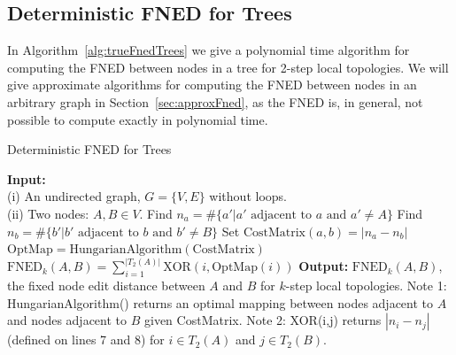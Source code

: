 \documentclass{article}
\begin{document}
\newpage
\subsection{Deterministic FNED for Trees}

In Algorithm~\ref{alg:trueFnedTrees} we give a polynomial time algorithm for computing the FNED between nodes in a tree for 2-step local topologies. We will give approximate algorithms for computing the FNED between nodes in an arbitrary graph in Section~\ref{sec:approxFned}, as the FNED is, in general, not possible to compute exactly in polynomial time.  %
\begin{algorithm}[h!tbp]
\caption{Deterministic FNED for Trees}
\label{alg:trueFnedTrees}
\begin{algorithmic}[1]
\STATE \textbf{Input:} \\(i) An undirected graph, $G = \{V,E\}$ without loops.\\(ii) Two nodes: $A, B \in V$.
\STATE Find $n_{a} = \# \{ a' | a' \text{ adjacent to } a \text{ and } a' \neq A \}$
\STATE Find $n_{b} = \# \{ b' | b' \text{ adjacent to } b \text{ and } b' \neq B \}$
\STATE Set $\text{CostMatrix}(a,b) = | n_{a} - n_{b} |$
\ENDFOR
\ENDFOR
\STATE $\text{OptMap}=\text{HungarianAlgorithm}(\text{CostMatrix})$
\STATE $\text{FNED}_{k}(A,B) = \sum_{i=1}^{|T_{2}(A)|} \text{XOR}(i,\text{OptMap}(i))$
\STATE \textbf{Output:} $\text{FNED}_{k}(A,B)$, the fixed node edit distance between $A$ and $B$ for $k$-step local topologies.
\STATE Note 1: HungarianAlgorithm() returns an optimal mapping between nodes adjacent to $A$ and nodes adjacent to $B$ given CostMatrix.
\STATE Note 2: XOR(i,j) returns $|n_{i} - n_{j}|$ (defined on lines 7 and 8) for $i \in T_{2}(A)$ and $j \in T_{2}(B)$.
\end{algorithmic}
\end{algorithm}
\end{document}
